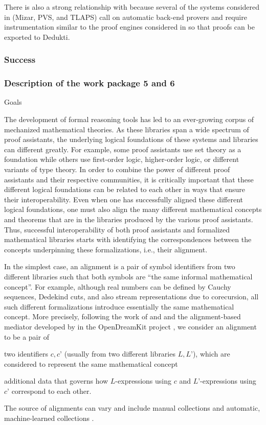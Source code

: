 There is also a strong relationship with  because several of the
systems considered in  (Mizar, PVS, and TLAPS) call on automatic
back-end provers and require instrumentation similar to the proof engines
considered in  so that proofs can be exported to Dedukti.

\subsubsection*{Success}



\subsubsection{Description of the work package 5 and 6}

{\color{red} Goals}

The development of formal reasoning tools has led to an ever-growing
corpus of mechanized mathematical theories. As these libraries span a
wide spectrum of proof assistants, the underlying logical foundations
of these systems and libraries can different greatly. For example,
some proof assistants use set theory as a foundation while others use
first-order logic, higher-order logic, or different variants of type
theory.  In order to combine the power of different proof assistants
and their respective communities, it is critically important that
these different logical foundations can be related to each other in
ways that ensure their interoperability.  Even when one has
successfully aligned these different logical foundations, one must
also align the many different mathematical concepts and theorems that
are in the libraries produced by the various proof assistants. Thus,
successful interoperability of both proof assistants and formalized
mathematical libraries starts with identifying the correspondences
between the concepts underpinning these formalizations, i.e., their
alignment.

In the simplest case, an alignment is a pair of symbol identifiers
from two different libraries such that both symbols are ``the same
informal mathematical concept''. For example, although real numbers
can be defined by Cauchy sequences, Dedekind cuts, and also stream
representations due to corecursion, all such different formalizations
introduce essentially the same mathematical concept. More precisely,
following the work of  and 
\cite{GKKMR:alignments:17} and the alignment-based mediator developed
by  in the OpenDreamKit project \cite{ODK:mitm:18}, we
consider an alignment to be a pair of
\begin{compactitem}
  \item two identifiers $c,c’$ (usually from two different libraries
    $L,L’$), which are considered to represent the same mathematical
    concept
  \item additional data that governs how $L$-expressions using $c$ and
    $L’$-expressions using $c’$ correspond to each other.
\end{compactitem}
The source of alignments can vary and include manual collections
\cite{MRLR:alignments:17} and automatic, machine-learned collections
\cite{align_kaliszyk}.

